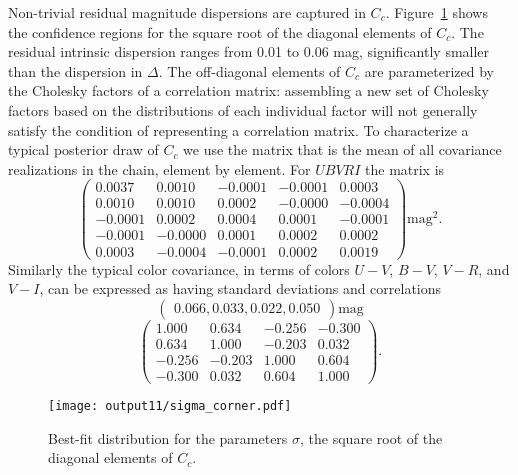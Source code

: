 \documentclass{aastex}   	%
\begin{document}
Non-trivial residual magnitude dispersions are captured in $C_c$.   Figure~\ref{sigma:fig} shows the confidence regions for the
square root of the diagonal elements of $C_c$.  The residual intrinsic dispersion ranges from 0.01 to 0.06 mag, significantly smaller
than the dispersion in $\Delta$.
The off-diagonal elements of $C_c$ are parameterized by the Cholesky factors of a correlation matrix: assembling
a new set of Cholesky factors based on the distributions of each individual factor will not generally satisfy the condition of representing a correlation matrix.  
To characterize a typical posterior draw of $C_c$ we use the matrix that is the mean of all covariance realizations in the
chain, element by element.
For $UBVRI$ the matrix is
\begin{equation}
\begin{pmatrix}
0.0037 & 0.0010 & -0.0001 & -0.0001 & 0.0003 \\
0.0010 & 0.0010 & 0.0002 & -0.0000 & -0.0004 \\
-0.0001 & 0.0002 & 0.0004 & 0.0001 & -0.0001 \\
-0.0001 & -0.0000 & 0.0001 & 0.0002 & 0.0002 \\
0.0003 & -0.0004 & -0.0001 & 0.0002 & 0.0019
 \end{pmatrix} \text{mag}^2.
 \end{equation}
Similarly the typical color covariance, in terms of colors $U-V$, $B-V$, $V-R$, and $V-I$, can
be expressed as having standard deviations and
 correlations
 \begin{equation}
 \begin{pmatrix}
0.066 , 0.033 , 0.022 , 0.050 
  \end{pmatrix} \text{mag}
 \label{color_sd:eqn}
   \end{equation}
 \begin{equation}
\begin{pmatrix}
1.000 & 0.634 & -0.256 & -0.300 \\
0.634 & 1.000 & -0.203 & 0.032 \\
-0.256 & -0.203 & 1.000 & 0.604 \\
-0.300 & 0.032 & 0.604 & 1.000
  \end{pmatrix}.
  \label{color_cor:eqn}
 \end{equation}
 
 \begin{figure}[htbp] %
   \centering
   \texttt{[image: output11/sigma\_corner.pdf]} 
   \caption{Best-fit distribution for the parameters $\sigma$, the square root of the diagonal elements of $C_c$.
   \label{sigma:fig}}
\end{figure}
\end{document}
